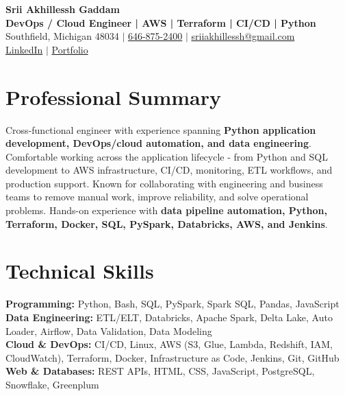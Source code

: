 \documentclass[letterpaper,10pt]{article}
\begin{document}
\fontsize{9.35pt}{10.45pt}\selectfont

\begin{center}
    {\LARGE \textbf{Srii Akhillessh Gaddam}} \\[-1pt]
    \textbf{DevOps / Cloud Engineer | AWS | Terraform | CI/CD | Python} \\[2pt]
    Southfield, Michigan 48034 $|$
    \href{tel:6468752400}{646-875-2400} $|$
    \href{mailto:sriiakhillessh@gmail.com}{sriiakhillessh@gmail.com} \\[1pt]
    \href{https://www.linkedin.com/in/srii-akhiilessh-gaddam-b48668191/}{LinkedIn} $|$
    \href{https://sriiakhillesshg.github.io/portfolio/}{Portfolio}
\end{center}
\vspace{-8pt}

\section{Professional Summary}
\small{Cross-functional engineer with experience spanning \textbf{Python application development, DevOps/cloud automation, and data engineering}. Comfortable working across the application lifecycle - from Python and SQL development to AWS infrastructure, CI/CD, monitoring, ETL workflows, and production support. Known for collaborating with engineering and business teams to remove manual work, improve reliability, and solve operational problems. Hands-on experience with \textbf{data pipeline automation, Python, Terraform, Docker, SQL, PySpark, Databricks, AWS, and Jenkins}.}

\section{Technical Skills}
\small{
\textbf{Programming:} Python, Bash, SQL, PySpark, Spark SQL, Pandas, JavaScript \\
\textbf{Data Engineering:} ETL/ELT, Databricks, Apache Spark, Delta Lake, Auto Loader, Airflow, Data Validation, Data Modeling \\
\textbf{Cloud \& DevOps:} CI/CD, Linux, AWS (S3, Glue, Lambda, Redshift, IAM, CloudWatch), Terraform, Docker, Infrastructure as Code, Jenkins, Git, GitHub \\
\textbf{Web \& Databases:} REST APIs, HTML, CSS, JavaScript, PostgreSQL, Snowflake, Greenplum
}
\end{document}
